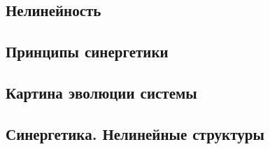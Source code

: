\documentclass[main.tex]{subfiles}
\begin{document}
\subsection{Нелинейность}



\subsection{Принципы синергетики}


\subsection{Картина эволюции системы}




\subsection{Синергетика. Нелинейные структуры}

\end{document}
